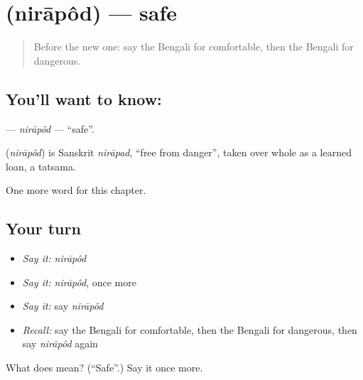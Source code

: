 \section[\texorpdfstring{\bn{নিরাপদ} (nirāpôd)}{নিরাপদ (nirāpôd)}]{ (nirāpôd) — safe}

\label{lesson:BN-C141-nirapod}



\begin{quote}
Before the new one: say the Bengali for comfortable, then the Bengali for dangerous.
\end{quote}

\subsection*{You'll want to know: }
\textbf{} — \emph{nirāpôd} — \textquotedblleft{}safe\textquotedblright{}.

\begin{cousinweb}
\textbf{} (\emph{nirāpôd}) is Sanskrit \emph{nirāpad}, \textquotedblleft{}free from danger\textquotedblright{}, taken over whole as a learned loan, a tatsama.
\end{cousinweb}

\begin{grammarlens}[title={What you've built}]
One more word for this chapter.
\end{grammarlens}

\subsection*{Your turn}
\begin{itemize}
\raggedright
  \item \emph{Say it:} \emph{nirāpôd}
  \item \emph{Say it:} \emph{nirāpôd}, once more
  \item \emph{Say it:} say \emph{nirāpôd}
  \item \emph{Recall:} say the Bengali for comfortable, then the Bengali for dangerous, then say \emph{nirāpôd} again
\end{itemize}

\begin{tcolorbox}[breakable,colback=teal!4,colframe=teal!35!black,title={Before you move on}]
What does  mean? (\textquotedblleft{}Safe\textquotedblright{}.) Say it once more.
\end{tcolorbox}
